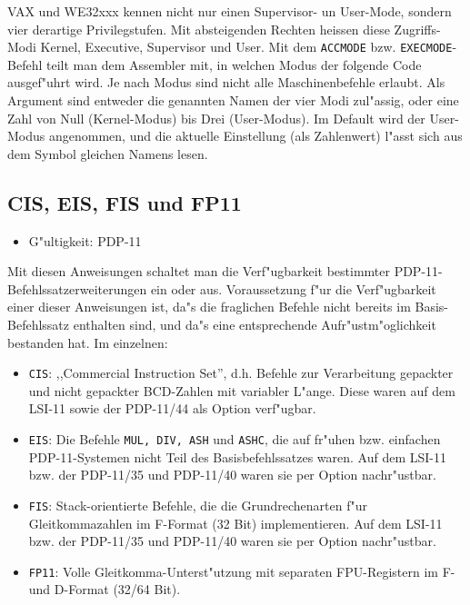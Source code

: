 \documentclass[12pt,a4paper,twoside]{report}
\makeatletter
\newcommand{\ttindex}[1]{\index{#1@{\tt #1}}}
\makeatother
\begin{document}
VAX und WE32xxx kennen nicht nur einen Supervisor- un User-Mode, sondern vier derartige
Privilegstufen.  Mit absteigenden Rechten heissen diese Zugriffs-Modi Kernel,
Executive, Supervisor und User.  Mit dem {\tt ACCMODE} bzw. {\tt EXECMODE}-Befehl teilt man dem
Assembler mit, in welchen Modus der folgende Code ausgef"uhrt wird.  Je nach
Modus sind nicht alle Maschinenbefehle erlaubt.  Als Argument sind entweder
die genannten Namen der vier Modi zul"assig, oder eine Zahl von Null
(Kernel-Modus) bis Drei (User-Modus).  Im Default wird der User-Modus angenommen,
und die aktuelle Einstellung (als Zahlenwert) l"asst sich aus dem Symbol gleichen
Namens lesen.


\subsection{CIS, EIS, FIS und FP11}
\ttindex{CIS}\ttindex{EIS}\ttindex{FIS}\ttindex{FP11}

{\em
\begin{itemize}
\item{G"ultigkeit: PDP-11}
\end{itemize}
}

Mit diesen Anweisungen schaltet man die Verf"ugbarkeit bestimmter
PDP-11-Befehlssatzerweiterungen ein oder aus.  Voraussetzung f"ur die
Verf"ugbarkeit einer dieser Anweisungen ist, da"s die fraglichen Befehle
nicht bereits im Basis-Befehlssatz enthalten sind, und da"s eine
entsprechende Aufr"ustm"oglichkeit bestanden hat.  Im einzelnen:
\begin{itemize}
\item{{\tt CIS}: ,,Commercial Instruction Set'', d.h. Befehle zur
      Verarbeitung gepackter und nicht gepackter BCD-Zahlen mit
      variabler L"ange.  Diese waren auf dem LSI-11 sowie der
      PDP-11/44 als Option verf"ugbar.}
\item{{\tt EIS}: Die Befehle {\tt MUL, DIV, ASH} und {\tt ASHC},
      die auf fr"uhen bzw. einfachen PDP-11-Systemen nicht Teil
      des Basisbefehlssatzes waren.  Auf dem LSI-11 bzw. der
      PDP-11/35 und PDP-11/40 waren sie per Option nachr"ustbar.}
\item{{\tt FIS}: Stack-orientierte Befehle, die die Grundrechenarten
      f"ur Gleitkommazahlen im F-Format (32 Bit) implementieren.
      Auf dem LSI-11 bzw. der PDP-11/35 und PDP-11/40 waren sie
      per Option nachr"ustbar.}
\item{{\tt FP11}: Volle Gleitkomma-Unterst"utzung mit separaten
      FPU-Registern im F- und D-Format (32/64 Bit).}
\end{itemize}
\end{document}
